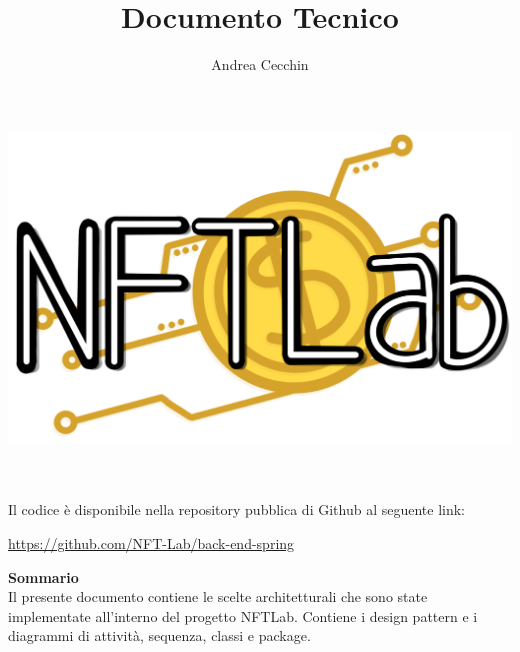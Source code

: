 


	\makeatletter
	\begin{titlepage}
		\begin{center}
			\vspace*{2,0cm}
			\author{Andrea Cecchin}
			\title{Documento Tecnico}
			\date{}
			\includegraphics[width=0.5\linewidth]{./immagini/logo.png}\\[4ex]

			
			{\huge \bfseries  \@title }\\[2ex] 
			{\LARGE  \@author}\\[50ex]
			\vspace*{-9,0cm}
			
		\vspace{4cm}
		Il codice è disponibile nella repository pubblica di Github al seguente link:
		\begin{center}
			\url{https://github.com/NFT-Lab/back-end-spring}
		\end{center}
	\vspace{2cm}
		\hfill \break
		\fontsize{17}{10}\textbf{Sommario} \\
		\vspace{0.1cm}
		Il presente documento contiene le scelte architetturali che sono state implementate all'interno del progetto NFTLab. Contiene i design pattern e i diagrammi di attività, sequenza, classi e package.
		\end{center}
	\end{titlepage}
	\makeatother
	
	\tableofcontents{}

	
	
	
